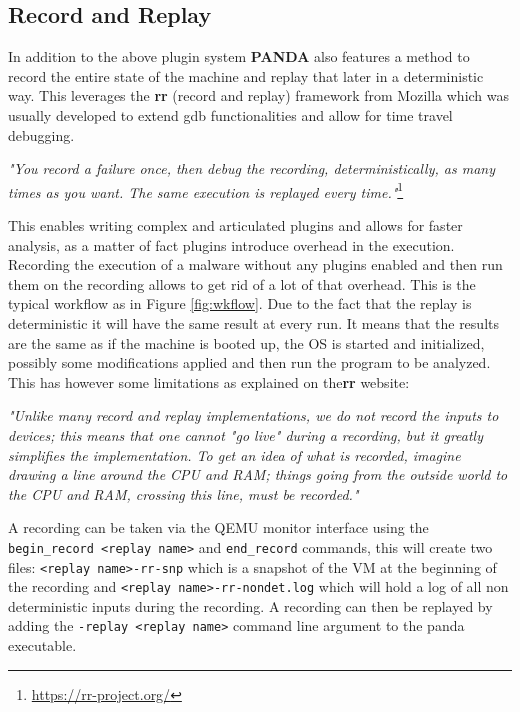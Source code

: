 \subsection{Record and Replay}

In addition to the above plugin system \textbf{PANDA} also features a method to record the entire state of the machine and replay that later in a deterministic way. This leverages the \textbf{rr} (record and replay) framework from Mozilla which was usually developed to extend gdb functionalities and allow for time travel debugging. 

\textit{"You record a failure once, then debug the recording, deterministically, as many times as you want. The same execution is replayed every time."}\footnote{\url{https://rr-project.org/}}

This enables writing complex and articulated plugins and allows for faster analysis, as a matter of fact plugins introduce overhead in the execution. Recording the execution of a malware without any plugins enabled and then run them on the recording allows to get rid of a lot of that overhead. This is the typical workflow as in Figure \ref{fig:wkflow}. Due to the fact that the replay is deterministic it will have the same result at every run. It means that the results are the same as if the machine is booted up, the OS is started and initialized, possibly some modifications applied and then run the program to be analyzed. This has however some limitations as explained on the\textbf{rr} website: 

\textit{"Unlike many record and replay implementations, we do not record the inputs to devices; this means that one cannot "go live" during a recording, but it greatly simplifies the implementation. To get an idea of what is recorded, imagine drawing a line around the CPU and RAM; things going from the outside world to the CPU and RAM, crossing this line, must be recorded."}

A recording can be taken via the QEMU monitor interface using the \lstinline{begin_record <replay name>} and \lstinline{end_record} commands, this will create two files: \lstinline{<replay name>-rr-snp} which is a snapshot of the VM at the beginning of the recording and \lstinline{<replay name>-rr-nondet.log} which will hold a log of all non deterministic inputs during the recording. A recording can then be replayed by adding the \lstinline{-replay <replay name>} command line argument to the panda executable. 

